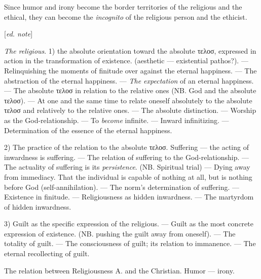 \documentclass[12pt,a4paper,openany]{book}
\newcommand{\kpage}[1]{\marginnote{\footnotesize\textit{[#1]}}}
\newcommand{\ed}[1]{{\small[\textit{ed.}\ #1]}}
\newcommand{\ednote}[1]{{\small[\textit{ed. note}]}}
\newcommand{\lecture}[1]{\par\bigskip\noindent{\large #1}\par\nobreak\medskip}
\begin{document}
Since humor and irony become the border territories of the religious and the
ethical, they can become the \emph{incognito} of the religious person and the ethicist.

\ednote{}

\emph{The religious}. 1) the absolute orientation toward the absolute τελοσ,
expressed in action in the transformation of existence. (aesthetic --- existential
\kpage{146}pathos?). --- Relinquishing the moments of finitude over against
the eternal happiness. --- The abstraction of the eternal happiness. ---
\emph{The expectation} of an eternal happiness. --- The absolute τελοσ in relation to
the relative ones (NB. God and the absolute τελοσ). --- At one and the same time to
relate oneself absolutely to the absolute τελοσ and relatively to the relative ones.
--- The absolute distinction. --- Worship as the God-relationship.
--- To \emph{become} infinite. --- Inward infinitizing. --- Determination
of the essence of the eternal happiness.

2) The practice of the relation to the absolute τελοσ. Suffering --- the acting of
inwardness is suffering. --- The relation of suffering to the God-relationship.
--- The actuality of suffering is its \emph{persistence}. (NB. Spiritual trial)
--- Dying away from immediacy. That the individual is capable of nothing at all,
but is nothing before God (self-annihilation). --- The norm's determination
of suffering. --- Existence in finitude. --- Religiousness
as hidden inwardness. --- The martyrdom of hidden inwardness.

3) Guilt as the specific expression of the religious. --- Guilt as
the most concrete expression of existence. (NB. pushing the guilt away from oneself).
--- The totality of guilt. --- The consciousness of guilt; its relation to immanence.
--- The eternal recollecting of guilt.

The relation between Religiousness A. and the Christian. Humor ---
irony.

\lecture{\ed{72.1 continued} Lecture 26}
\end{document}
